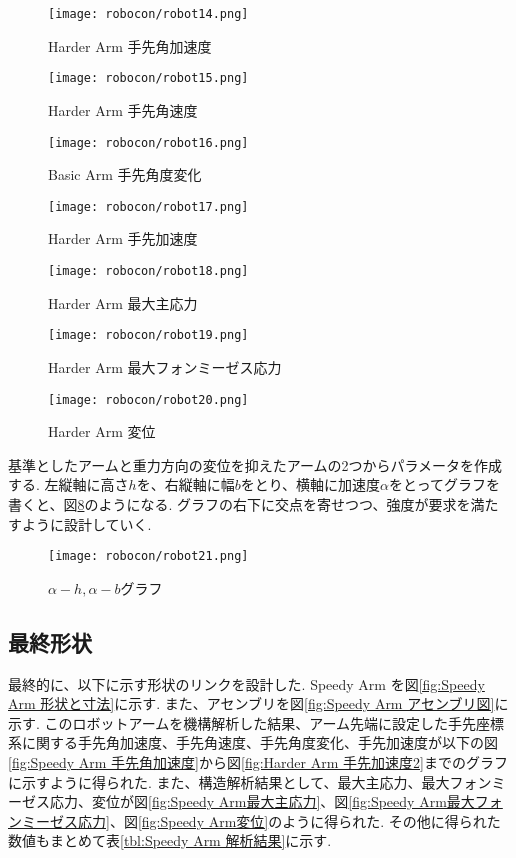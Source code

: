\documentclass[10pt,b5paper,papersize,dvipdfmx]{jsbook}
\begin{document}
\begin{figure}[htbp]
  \centering
  \texttt{[image: robocon/robot14.png]}
  \caption{Harder Arm 手先角加速度}
  \label{fig:Harder Arm 手先角加速度}
\end{figure}
\begin{figure}[htbp]
  \centering
  \texttt{[image: robocon/robot15.png]}
  \caption{Harder Arm 手先角速度}
  \label{fig:Harder Arm 手先角速度}
\end{figure}
\begin{figure}[htbp]
  \centering
  \texttt{[image: robocon/robot16.png]}
  \caption{Basic Arm 手先角度変化}
  \label{fig:Basic Arm 手先角度変化}
\end{figure}
\begin{figure}[htbp]
  \centering
  \texttt{[image: robocon/robot17.png]}
  \caption{Harder Arm 手先加速度}
  \label{fig:Harder Arm 手先加速度}
\end{figure}
\begin{figure}[htbp]
  \centering
  \texttt{[image: robocon/robot18.png]}
  \caption{Harder Arm 最大主応力}
  \label{fig:Harder Arm 最大主応力}
\end{figure}
\begin{figure}[htbp]
  \centering
  \texttt{[image: robocon/robot19.png]}
  \caption{Harder Arm 最大フォンミーゼス応力}
  \label{fig:Harder Arm 最大フォンミーゼス応力}
\end{figure}
\begin{figure}[htbp]
  \centering
  \texttt{[image: robocon/robot20.png]}
  \caption{Harder Arm 変位}
  \label{fig:Harder Arm 変位}
\end{figure}
基準としたアームと重力方向の変位を抑えたアームの2つからパラメータを作成する. 左縦軸に高さ$h$を、右縦軸に幅$b$をとり、横軸に加速度$\alpha$をとってグラフを書くと、図\ref{fig:alpha-h, alpha-b グラフ}のようになる. グラフの右下に交点を寄せつつ、強度が要求を満たすように設計していく.
\begin{figure}[htbp]
  \centering
  \texttt{[image: robocon/robot21.png]}
  \caption{$\alpha-h, \alpha-b$グラフ}
  \label{fig:alpha-h, alpha-b グラフ}
\end{figure}

\clearpage
\subsection{最終形状}
最終的に、以下に示す形状のリンクを設計した. Speedy Arm を図\ref{fig:Speedy Arm 形状と寸法}に示す. また、アセンブリを図\ref{fig:Speedy Arm アセンブリ図}に示す. 
このロボットアームを機構解析した結果、アーム先端に設定した手先座標系に関する手先角加速度、手先角速度、手先角度変化、手先加速度が以下の図\ref{fig:Speedy Arm 手先角加速度}から図\ref{fig:Harder Arm 手先加速度2}までのグラフに示すように得られた. 
また、構造解析結果として、最大主応力、最大フォンミーゼス応力、変位が図\ref{fig:Speedy Arm最大主応力}、図\ref{fig:Speedy Arm最大フォンミーゼス応力}、図\ref{fig:Speedy Arm変位}のように得られた. 
その他に得られた数値もまとめて表\ref{tbl:Speedy Arm 解析結果}に示す.
\end{document}
